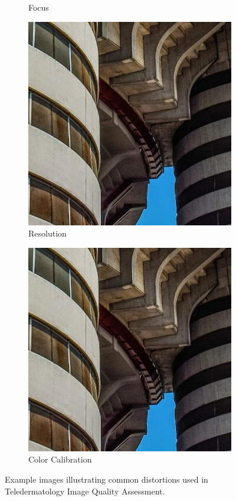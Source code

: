 \begin{figure}[ht]
\begin{subfigure}[b]{0.24\textwidth}
        \caption{Focus}
        \label{fig:focus}
    \end{subfigure}
    \hfill
    \begin{subfigure}[b]{0.24\textwidth}
        \includegraphics[width=\textwidth]{img/Original.jpg}
        \caption{Resolution}
        \label{fig:resol}
    \end{subfigure}
    \hfill
    \begin{subfigure}[b]{0.24\textwidth}
        \includegraphics[width=\textwidth]{img/Original.jpg}
        \caption{Color Calibration}
        \label{fig:cc}
    \end{subfigure}
    \caption{Example images illustrating common distortions used in Teledermatology Image Quality Assessment.}
    \label{fig:quality_criteria}
\end{figure}
